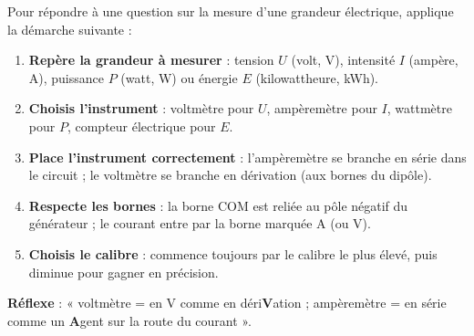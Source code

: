 \documentclass[11pt]{article}
\newcommand{\cle}[1]{{\popxbold\color{popdark}#1}}
\begin{document}
\begin{methode}
Pour répondre à une question sur la mesure d'une grandeur électrique, applique la démarche suivante :
\begin{enumerate}
\item \textbf{Repère la grandeur à mesurer} : tension $U$ (volt, V), intensité $I$ (ampère, A), puissance $P$ (watt, W) ou énergie $E$ (kilowattheure, kWh).
\item \textbf{Choisis l'instrument} : voltmètre pour $U$, ampèremètre pour $I$, wattmètre pour $P$, compteur électrique pour $E$.
\item \textbf{Place l'instrument correctement} : l'ampèremètre se branche en \cle{série} dans le circuit ; le voltmètre se branche en \cle{dérivation} (aux bornes du dipôle).
\item \textbf{Respecte les bornes} : la borne COM est reliée au pôle négatif du générateur ; le courant entre par la borne marquée A (ou V).
\item \textbf{Choisis le calibre} : commence toujours par le calibre le plus élevé, puis diminue pour gagner en précision.
\end{enumerate}
\textbf{Réflexe} : « voltmètre = en V comme en déri\textbf{V}ation ; ampèremètre = en série comme un \textbf{A}gent sur la route du courant ».
\end{methode}
\end{document}
